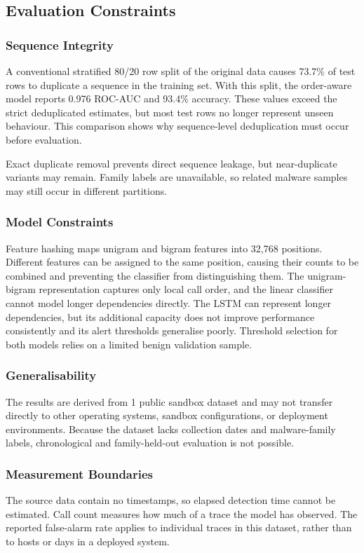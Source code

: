 \documentclass[10pt,twocolumn]{article}
\begin{document}
\subsection{Evaluation Constraints}
\subsubsection{Sequence Integrity}
A conventional stratified 80/20 row split of the original data causes 73.7\% of test rows to duplicate a sequence in the training set. With this split, the order-aware model reports 0.976 ROC-AUC and 93.4\% accuracy. These values exceed the strict deduplicated estimates, but most test rows no longer represent unseen behaviour. This comparison shows why sequence-level deduplication must occur before evaluation.

Exact duplicate removal prevents direct sequence leakage, but near-duplicate variants may remain. Family labels are unavailable, so related malware samples may still occur in different partitions.

\subsubsection{Model Constraints}
Feature hashing maps unigram and bigram features into 32,768 positions. Different features can be assigned to the same position, causing their counts to be combined and preventing the classifier from distinguishing them. The unigram-bigram representation captures only local call order, and the linear classifier cannot model longer dependencies directly. The LSTM can represent longer dependencies, but its additional capacity does not improve performance consistently and its alert thresholds generalise poorly. Threshold selection for both models relies on a limited benign validation sample.

\subsubsection{Generalisability}
The results are derived from 1 public sandbox dataset and may not transfer directly to other operating systems, sandbox configurations, or deployment environments. Because the dataset lacks collection dates and malware-family labels, chronological and family-held-out evaluation is not possible.

\subsubsection{Measurement Boundaries}
The source data contain no timestamps, so elapsed detection time cannot be estimated. Call count measures how much of a trace the model has observed. The reported false-alarm rate applies to individual traces in this dataset, rather than to hosts or days in a deployed system.
\end{document}
